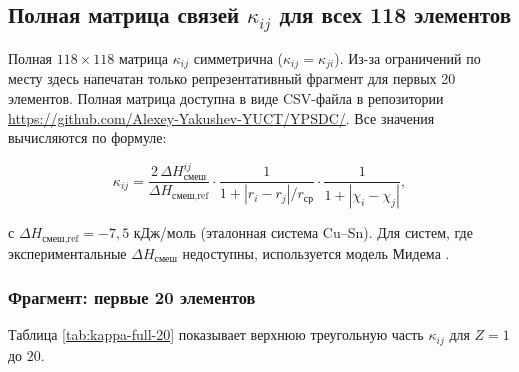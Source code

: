 \documentclass[12pt,a4paper]{article}
\begin{document}
	\subsection{Полная матрица связей \(\kappa_{ij}\) для всех 118 элементов}
	\label{subsec:full-kappa}
	
	Полная \(118\times118\) матрица \(\kappa_{ij}\) симметрична (\(\kappa_{ij}=\kappa_{ji}\)). Из-за ограничений по месту здесь напечатан только репрезентативный фрагмент для первых 20 элементов. Полная матрица доступна в виде CSV-файла в репозитории \url{https://github.com/Alexey-Yakushev-YUCT/YPSDC/}. Все значения вычисляются по формуле:
	
	\[
	\kappa_{ij} = \frac{2\,\Delta H_{\text{смеш}}^{ij}}{\Delta H_{\text{смеш,ref}}} \cdot
	\frac{1}{1 + |r_i - r_j|/r_{\text{ср}}} \cdot
	\frac{1}{1 + |\chi_i - \chi_j|},
	\]
	
	с \(\Delta H_{\text{смеш,ref}} = -7,5\) кДж/моль (эталонная система Cu–Sn). Для систем, где экспериментальные \(\Delta H_{\text{смеш}}\) недоступны, используется модель Мидема \cite{Miedema1980}.
	
	\subsubsection*{Фрагмент: первые 20 элементов}
	Таблица \ref{tab:kappa-full-20} показывает верхнюю треугольную часть \(\kappa_{ij}\) для \(Z=1\) до \(20\).
	
\end{document}
